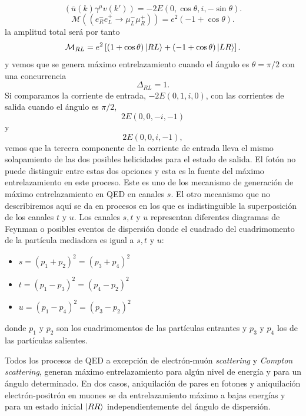 \documentclass{article}
\theoremstyle{plain}
\theoremstyle{definition}
\begin{document}
	\[ \left(\overline{u}(k)\gamma^{\mu}v(k\prime) \right) = -2E(0,\cos\theta,i,-\sin\theta)\text{.}\]
	\[\mathcal{M}((e_R^-e_L^+ \rightarrow \mu_L^-\mu_R^+)) = e^2(-1+\cos\theta)\text{.} \] la amplitud total será por tanto
	\[\mathcal{M}_{RL} = e^2\left[(1+\cos\theta)\ket{RL} + (-1+\cos\theta)\ket{LR} \right] \text{.}\]
	y vemos que se genera máximo entrelazamiento cuando el ángulo es \(\theta = \pi/2\)  con una concurrencia \[ \Delta_{RL} = 1\text{.}\] Si comparamos la corriente de entrada, \(-2E(0,1,i,0)\), con las corrientes de salida  cuando el ángulo es \(\pi/2 \),  \[2E(0,0,-i,-1) \] y \[2E(0,0,i,-1), \] vemos que la tercera componente de la corriente de entrada lleva el mismo solapamiento de las dos posibles helicidades para el estado de salida. El fotón no puede distinguir entre estas dos opciones y esta es la fuente del máximo  entrelazamiento en este proceso. Este es uno de los mecanismo de generación de máximo entrelazamiento en QED en canales \(s\). El otro mecanismo que no describiremos aquí se da en procesos en los que es indistinguible la superposición de los canales \(t\) y \(u\). Los canales \(s,t\) y \(u\)  representan diferentes diagramas de Feynman o posibles eventos de dispersión donde el cuadrado del cuadrimomento de la partícula mediadora es igual a \(s,t\) y \(u\):	
	\begin{itemize}
\item \(s = (p_1+p_2)^2 = (p_3+p_4)^2\)
\item \(t = (p_1-p_3)^2 = (p_4-p_2)^2\)
\item \(u = (p_1-p_4)^2 = (p_3-p_2)^2\)
	\end{itemize}
donde \(p_1 \text{ y } p_2\) son los cuadrimomentos de las partículas entrantes y \(p_3\text{ y }p_4\) los de las partículas salientes.
	 \par	
	Todos los procesos de QED a excepción de electrón-muón \textit{scattering} y \textit{Compton scattering}, generan máximo entrelazamiento para algún nivel de energía y para un ángulo determinado. En dos casos, aniquilación de pares en fotones y aniquilación electrón-positrón en muones se da entrelazamiento máximo a bajas energías y para un estado inicial \( \ket{RR}\) independientemente del ángulo de dispersión.
\end{document}
